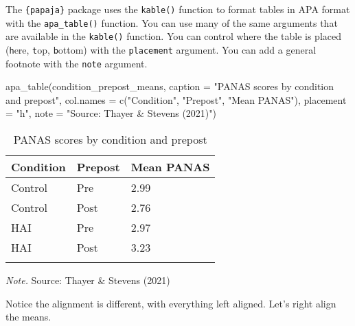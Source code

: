 \documentclass[
  doc]{apa6}
\newenvironment{Shaded}{\begin{snugshade}}{\end{snugshade}}
\newcommand{\AttributeTok}[1]{\textcolor[rgb]{0.77,0.63,0.00}{#1}}
\newcommand{\FunctionTok}[1]{\textcolor[rgb]{0.00,0.00,0.00}{#1}}
\newcommand{\NormalTok}[1]{#1}
\newcommand{\StringTok}[1]{\textcolor[rgb]{0.31,0.60,0.02}{#1}}
\begin{document}
The \texttt{\{papaja\}} package uses the \texttt{kable()} function to format tables in APA format with the \texttt{apa\_table()} function. You can use many of the same arguments that are available in the \texttt{kable()} function. You can control where the table is placed (\texttt{h}ere, \texttt{t}op, \texttt{b}ottom) with the \texttt{placement} argument. You can add a general footnote with the \texttt{note} argument.

\begin{Shaded}
\begin{Highlighting}[]
\FunctionTok{apa\_table}\NormalTok{(condition\_prepost\_means,}
          \AttributeTok{caption =} \StringTok{"PANAS scores by condition and prepost"}\NormalTok{,}
          \AttributeTok{col.names =} \FunctionTok{c}\NormalTok{(}\StringTok{"Condition"}\NormalTok{, }\StringTok{"Prepost"}\NormalTok{, }\StringTok{"Mean PANAS"}\NormalTok{),}
          \AttributeTok{placement =} \StringTok{"h"}\NormalTok{,}
          \AttributeTok{note =} \StringTok{"Source: Thayer \& Stevens (2021)"}\NormalTok{)}
\end{Highlighting}
\end{Shaded}

\begin{table}[h]

\begin{center}
\begin{threeparttable}

\caption{\label{tab:unnamed-chunk-19}PANAS scores by condition and prepost}

\begin{tabular}{lll}
\toprule
Condition & Prepost & Mean PANAS\\
\midrule
Control & Pre & 2.99\\
Control & Post & 2.76\\
HAI & Pre & 2.97\\
HAI & Post & 3.23\\
\bottomrule
\addlinespace
\end{tabular}

\begin{tablenotes}[para]
\normalsize{\textit{Note.} Source: Thayer \& Stevens (2021)}
\end{tablenotes}

\end{threeparttable}
\end{center}

\end{table}

Notice the alignment is different, with everything left aligned. Let's right align the means.
\end{document}
